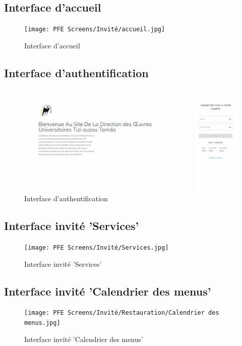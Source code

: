     \subsection{Interface d'accueil}
    \begin{figure}[H]
        \centering
        \texttt{[image: PFE Screens/Invité/accueil.jpg]}
        \caption{Interface d'accueil}
    \end{figure}

    \subsection{Interface d'authentification}
    \begin{figure}[H]
        \centering
        \includegraphics[scale=0.21]{PFE Screens/Connection.jpg}
        \caption{Interface d'authentification}
    \end{figure}

    \subsection{Interface invité 'Services'}
    \begin{figure}[H]
        \centering
        \texttt{[image: PFE Screens/Invité/Services.jpg]}
        \caption{Interface invité 'Services'}
    \end{figure}

    \subsection{Interface invité 'Calendrier des menus'}
    \begin{figure}[H]
        \centering
        \texttt{[image: PFE Screens/Invité/Restauration/Calendrier des menus.jpg]}
        \caption{Interface invité 'Calendrier des menus'}
    \end{figure}

